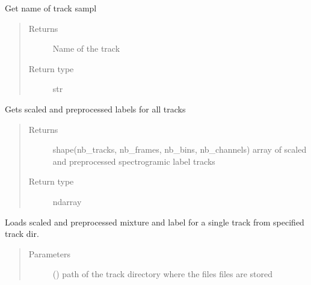 \documentclass[letterpaper,10pt,english]{sphinxmanual}
\begin{document}
\begin{fulllineitems}
\begin{fulllineitems}
\end{fulllineitems}


\begin{fulllineitems}
\label{\detokenize{docs/source/dataset:dataset.Dataset.get_track_name}}
Get name of track sampl
\begin{quote}\begin{description}
\item[{Returns}] \leavevmode
Name of the track

\item[{Return type}] \leavevmode
str

\end{description}\end{quote}

\end{fulllineitems}


\begin{fulllineitems}
\label{\detokenize{docs/source/dataset:dataset.Dataset.labels}}
Gets scaled and preprocessed labels for all tracks
\begin{quote}\begin{description}
\item[{Returns}] \leavevmode
{} \textendash{} shape(nb\_tracks, nb\_frames, nb\_bins, nb\_channels)
array of scaled and preprocessed spectrogramic label tracks

\item[{Return type}] \leavevmode
ndarray

\end{description}\end{quote}

\end{fulllineitems}


\begin{fulllineitems}
\label{\detokenize{docs/source/dataset:dataset.Dataset.load}}
Loads scaled and preprocessed mixture and label for a single track from specified track dir.
\begin{quote}\begin{description}
\item[{Parameters}] \leavevmode
{} () \textendash{} path of the track directory where the files files are stored


\end{description}
\end{quote}
\end{fulllineitems}
\end{fulllineitems}
\end{document}
